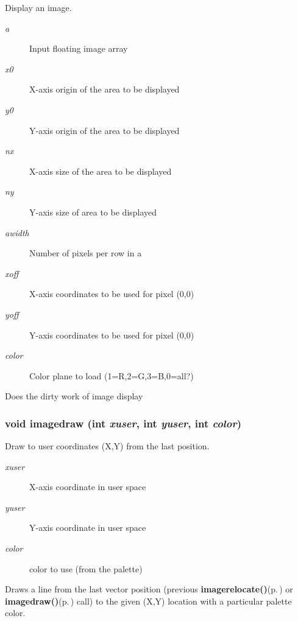 Display an image. 

\begin{Desc}
\item[Parameters:]
\begin{description}
\item[{\em a}]Input floating image array \item[{\em x0}]X-axis origin of the area to be displayed \item[{\em y0}]Y-axis origin of the area to be displayed \item[{\em nx}]X-axis size of the area to be displayed \item[{\em ny}]Y-axis size of area to be displayed \item[{\em awidth}]Number of pixels per row in a \item[{\em xoff}]X-axis coordinates to be used for pixel (0,0) \item[{\em yoff}]Y-axis coordinates to be used for pixel (0,0) \item[{\em color}]Color plane to load (1=R,2=G,3=B,0=all?)\end{description}
\end{Desc}
Does the dirty work of image display 
\subsubsection{\setlength{\rightskip}{0pt plus 5cm}void imagedraw (int {\em xuser}, int {\em yuser}, int {\em color})}\label{xtvutils_8c_a179}


Draw to user coordinates (X,Y) from the last position. 

\begin{Desc}
\item[Parameters:]
\begin{description}
\item[{\em xuser}]X-axis coordinate in user space \item[{\em yuser}]Y-axis coordinate in user space \item[{\em color}]color to use (from the palette)\end{description}
\end{Desc}
Draws a line from the last vector position (previous {\bf imagerelocate()}{\rm (p.\,\pageref{xtv_8h_a72})} or {\bf imagedraw()}{\rm (p.\,\pageref{xtv_8h_a73})} call) to the given (X,Y) location with a particular palette color.

